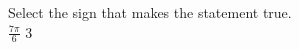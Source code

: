 \documentclass{ximera}
\author{David Kish}
\begin{document}
\begin{exercise}
Select the sign that makes the statement true.\\
$\frac{7\pi}{6}$ \wordChoice{\choice{$<$}\choice[correct]{$>$}\choice{$=$}} $3$ 

\end{exercise}
\end{document}

